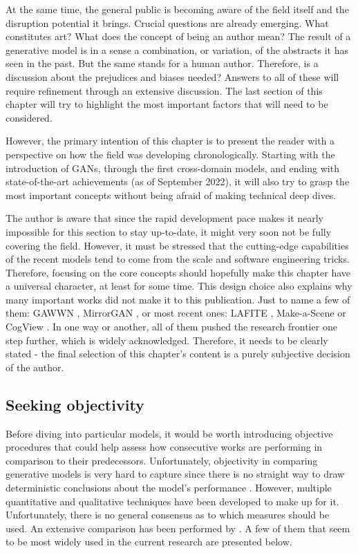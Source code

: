 \documentclass[
]{krantz}
\begin{document}
At the same time, the general public is becoming aware of the field itself and the disruption potential it brings. Crucial questions are already emerging. What constitutes art? What does the concept of being an author mean? The result of a generative model is in a sense a combination, or variation, of the abstracts it has seen in the past. But the same stands for a human author. Therefore, is a discussion about the prejudices and biases needed? Answers to all of these will require refinement through an extensive discussion. The last section of this chapter will try to highlight the most important factors that will need to be considered.

However, the primary intention of this chapter is to present the reader with a perspective on how the field was developing chronologically. Starting with the introduction of GANs, through the first cross-domain models, and ending with state-of-the-art achievements (as of September 2022), it will also try to grasp the most important concepts without being afraid of making technical deep dives.

The author is aware that since the rapid development pace makes it nearly impossible for this section to stay up-to-date, it might very soon not be fully covering the field. However, it must be stressed that the cutting-edge capabilities of the recent models tend to come from the scale and software engineering tricks. Therefore, focusing on the core concepts should hopefully make this chapter have a universal character, at least for some time. This design choice also explains why many important works did not make it to this publication. Just to name a few of them: GAWWN \citep{GAWWN2016}, MirrorGAN \citep{MirrorGAN2019}, or most recent ones: LAFITE \citep{LAFITE2021}, Make-a-Scene \citep{MakeAScene2022} or CogView \citep{CogView2021}. In one way or another, all of them pushed the research frontier one step further, which is widely acknowledged. Therefore, it needs to be clearly stated - the final selection of this chapter's content is a purely subjective decision of the author.

\hypertarget{seeking-objectivity}{%
\subsection{Seeking objectivity}\label{seeking-objectivity}}

Before diving into particular models, it would be worth introducing objective procedures that could help assess how consecutive works are performing in comparison to their predecessors. Unfortunately, objectivity in comparing generative models is very hard to capture since there is no straight way to draw deterministic conclusions about the model's performance \citep{Evaluation2015}. However, multiple quantitative and qualitative techniques have been developed to make up for it. Unfortunately, there is no general consensus as to which measures should be used. An extensive comparison has been performed by \citet{EvaluationComparison2018}. A few of them that seem to be most widely used in the current research are presented below.
\end{document}
